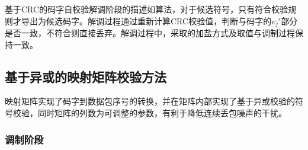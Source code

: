 基于CRC的码字自校验解调阶段的描述如算法，对于候选符号，只有符合校验规则才导出为候选码字。解调过程通过重新计算CRC校验值，判断与码字的$v_{j}'$部分是否一致，不符合则直接丢弃。解调过程中，采取的加盐方式及取值与调制过程保持一致。

\subsection{基于异或的映射矩阵校验方法}
\label{chap:hash:robustness:xor}

映射矩阵实现了码字到数据包序号的转换，并在矩阵内部实现了基于异或校验的符号校验，同时矩阵的列数为可调整的参数，有利于降低连续丢包噪声的干扰。

\subsubsection{调制阶段}
\label{chap:hash:robustness:xor:modulation}


